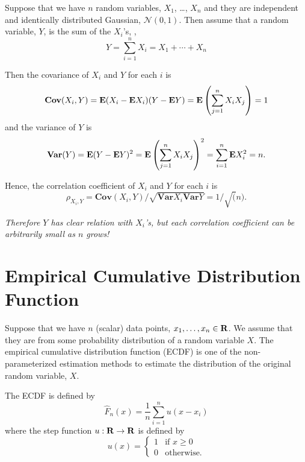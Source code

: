 Suppose that we have $n$ random variables, $X_1$, \ldots, $X_n$
and they are independent and identically distributed Gaussian, $\mathcal{N}(0,1)$.
Then assume that a random variable, $Y$, is the sum of the $X_i$'s,
\ie,
\begin{equation}
Y = \sum_{i=1}^n X_i = X_1 + \cdots + X_n
\end{equation}

Then the covariance of $X_i$ and $Y$ for each $i$ is
\begin{equation}
\mathbf{Cov}(X_i,Y) = {\bf E{}} (X_i - {\bf E{}}{X_i})( Y - {\bf E{}} Y) = {\bf E{}}\left( \sum_{j=1}^n X_iX_j\right) = 1
\end{equation}
and
the variance of $Y$ is
\begin{equation}
\mathbf{Var}(Y) = {\bf E{}} (Y - {\bf E{}} Y)^2 = {\bf E{}}\left( \sum_{j=1}^n X_iX_j\right)^2
= \sum_{i=1}^n {\bf E{}} X_i^2 = n.
\end{equation}

Hence, the correlation coefficient of $X_i$ and $Y$ for each $i$ is
\begin{equation}
\rho_{X_i,Y} = \mathbf{Cov}(X_i,Y) / \sqrt{\mathbf{Var}X_i \mathbf{Var} Y} = 1 / \sqrt(n).
\end{equation}

\emph{Therefore $Y$ has clear relation with $X_i$'s, but each correlation coefficient can be arbitrarily small as $n$ grows!}


\section{Empirical Cumulative Distribution Function}

Suppose that we have $n$ (scalar) data points, $x_1, \ldots, x_n \in\mathbf{R}$.
We assume that they are from some probability distribution of a random variable $X$.
The empirical cumulative distribution function (ECDF) is one of the non-parameterized estimation methods
to estimate the distribution of the original random variable, $X$.

The ECDF is defined by
\begin{equation}
\hat{F}_n(x) = \frac{1}{n} \sum_{i=1}^n u(x-x_i)
\end{equation}
where the step function $u:\mathbf{R}\to\mathbf{R}$ is defined by
\begin{equation}
u(x) = \left\{\begin{array}{ll}
1 & \mbox{if } x \geq 0
\\
0 & \mbox{otherwise.}
\end{array}\right.
\end{equation}

